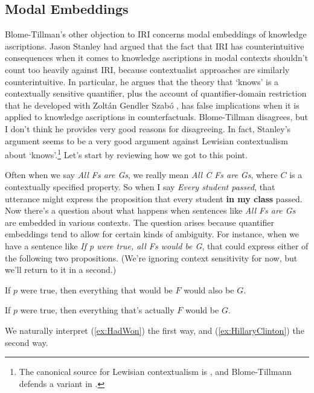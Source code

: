 \subsection{Modal Embeddings}
Blome-Tillman's other objection to IRI concerns modal embeddings of knowledge ascriptions. Jason Stanley had argued that the fact that IRI has counterintuitive consequences when it comes to knowledge ascriptions in modal contexts shouldn't count too heavily against IRI, because contextualist approaches are similarly counterintuitive. In particular, he argues that the theory that `knows' is a contextually sensitive quantifier, plus the account of quantifier-domain restriction that he developed with Zolt\'{a}n Gendler Szab\'{o} \citep{Stanley2000-STAOQD}, has false implications when it is applied to knowledge ascriptions in counterfactuals. Blome-Tillman disagrees, but I don't think he provides very good reasons for disagreeing. In fact, Stanley's argument seems to be a very good argument against Lewisian contextualism about `knows'.\footnote{The canonical source for Lewisian contextualism is \cite{Lewis1996b}, and Blome-Tillmann defends a variant in \cite{MBT2009a}.} Let's start by reviewing how we got to this point.

Often when we say \textit{All Fs are Gs}, we really mean \textit{All C Fs are Gs}, where \(C\) is a contextually specified property. So when I say \textit{Every student passed}, that utterance might express the proposition that every student \textbf{in my class} passed. Now there's a question about what happens when sentences like \textit{All Fs are Gs} are embedded in various contexts. The question arises because quantifier embeddings tend to allow for certain kinds of ambiguity. For instance, when we have a sentence like \textit{If p were true, all Fs would be G}, that could express either of the following two propositions. (We're ignoring context sensitivity for now, but we'll return to it in a second.)

\begin{itemize*}
\item If \(p\) were true, then everything that would be \(F\) would also be \(G\).
\item If \(p\) were true, then everything that's actually \(F\) would be \(G\).
\end{itemize*}

\noindent We naturally interpret (\ref{ex:HadWon}) the first way, and (\ref{ex:HillaryClinton}) the second way.


